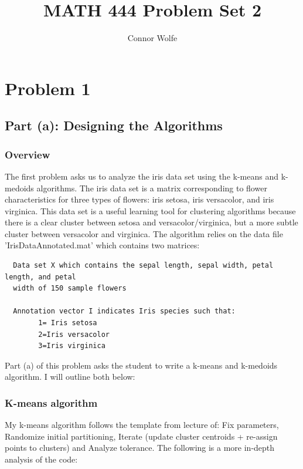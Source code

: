 \documentclass{article}
\title{MATH 444 Problem Set 2}
\author{Connor Wolfe}
\begin{document}
\maketitle

\section*{Problem 1}

\subsection*{Part (a): Designing the Algorithms}

\subsubsection*{Overview}

The first problem asks us to analyze the iris data set using the k-means and k-medoids algorithms.  The iris data set is a matrix corresponding to flower characteristics for three types of flowers: iris setosa, iris versacolor, and iris virginica.  This data set is a useful learning tool for clustering algorithms because there is a clear cluster between setosa and versacolor/virginica, but a more subtle cluster between versacolor and virginica.  The algorithm relies on the data file 'IrisDataAnnotated.mat' which contains two matrices: 
\begin{verbatim}  Data set X which contains the sepal length, sepal width, petal length, and petal 
  width of 150 sample flowers 
  
  Annotation vector I indicates Iris species such that:
        1= Iris setosa
        2=Iris versacolor
        3=Iris virginica
\end{verbatim} 

Part (a) of this problem asks the student to write a k-means and k-medoids algorithm.  I will outline both below:

\subsubsection*{K-means algorithm}
My k-means algorithm follows the template from lecture of: Fix parameters, Randomize initial partitioning, Iterate (update cluster centroids + re-assign points to clusters) and Analyze tolerance.  The following is a more in-depth analysis of the code:
\end{document}
